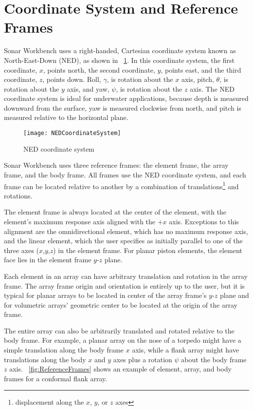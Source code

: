 \section{Coordinate System and Reference Frames}\label{sec:coord}
Sonar Workbench uses a right-handed, Cartesian coordinate system known as North-East-Down (NED), as shown in \figname~\ref{fig:NED}. In this coordinate system, the first coordinate, $x$, points north, the second coordinate, $y$, points east, and the third coordinate, $z$, points down. Roll, $\gamma$, is rotation about the $x$ axis, pitch, $\theta$, is rotation about the $y$ axis, and yaw, $\psi$, is rotation about the $z$ axis. The NED coordinate system is ideal for underwater applications, because depth is measured downward from the surface, yaw is measured clockwise from north, and pitch is measured relative to the horizontal plane.

\begin{figure}[!ht]
\begin{center}
\texttt{[image: NEDCoordinateSystem]}
\caption{\label{fig:NED}NED coordinate system}
\end{center}
\end{figure}

Sonar Workbench uses three reference frames: the element frame, the array frame, and the body frame. All frames use the NED coordinate system, and each frame can be located relative to another by a combination of translations\footnote{displacement along the $x$, $y$, or $z$ axes} and rotations.

The element frame is always located at the center of the element, with the element's maximum response axis aligned with the $+x$ axis. Exceptions to this alignment are the omnidirectional element, which has no maximum response axis, and the linear element, which the user specifies as initially parallel to one of the three axes ($x$,$y$,$z$) in the element frame. For planar piston elements, the element face lies in the element frame $y$-$z$ plane.

Each element in an array can have arbitrary translation and rotation in the array frame. The array frame origin and orientation is entirely up to the user, but it is typical for planar arrays to be located in center of the array frame's $y$-$z$ plane and for volumetric arrays' geometric center to be located at the origin of the array frame.

The entire array can also be arbitrarily translated and rotated relative to the body frame. For example, a planar array on the nose of a torpedo might have a simple translation along the body frame $x$ axis, while a flank array might have translations along the body $x$ and $y$ axes plus a rotation $\psi$ about the body frame $z$ axis. \figurename~\ref{fig:ReferenceFrames} shows an example of element, array, and body frames for a conformal flank array.

